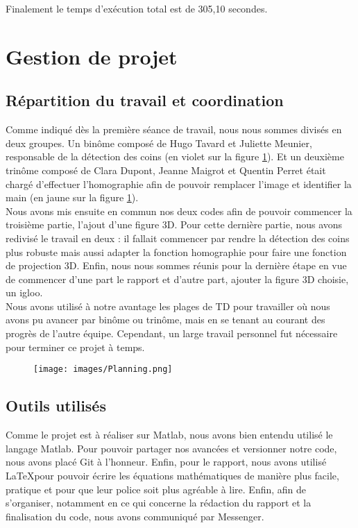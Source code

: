 \documentclass[blue]{ceri/sty/rapport}
\begin{document}
Finalement le temps d'exécution total est de 305,10 secondes. 
\section{Gestion de projet}
\label{sec:Generalites4}


\subsection{Répartition du travail et coordination}
Comme indiqué dès la première séance de travail,  nous nous sommes divisés en deux groupes. Un binôme composé de Hugo Tavard et Juliette Meunier, responsable de la détection des coins (en violet sur la figure 
 \ref{fig:uapv}). Et un deuxième trinôme composé de Clara Dupont, Jeanne Maigrot et Quentin Perret était chargé d'effectuer l'homographie afin de pouvoir remplacer l'image et identifier la main (en jaune sur la figure  \ref{fig:uapv}).
\\

Nous avons mis ensuite en commun nos deux codes afin de pouvoir commencer la troisième partie, l'ajout d'une figure 3D. Pour cette dernière partie, nous avons redivisé le travail en deux : il fallait commencer par rendre la détection des coins plus robuste mais aussi adapter la fonction homographie pour faire une fonction de projection 3D. Enfin, nous nous sommes réunis pour la dernière étape en vue de commencer d'une part le rapport et d'autre part, ajouter la figure 3D choisie, un igloo.
\\

Nous avons utilisé à notre avantage les plages de TD pour travailler où nous avons pu avancer par binôme ou trinôme, mais en se tenant au courant des progrès de l'autre équipe. Cependant, un large travail personnel fut nécessaire pour terminer ce projet à temps.  

\begin{figure}[H]
\centering
\texttt{[image: images/Planning.png]}
\caption[planning]{}
\label{fig:uapv}
\end{figure}

\subsection{Outils utilisés}
Comme le projet est à réaliser sur Matlab, nous avons bien entendu utilisé le langage Matlab. Pour pouvoir partager nos avancées et versionner notre code, nous avons placé Git à l'honneur.
Enfin, pour le rapport, nous avons utilisé \LaTeX  pour pouvoir écrire les équations mathématiques de manière plus facile, pratique et pour que leur police soit plus agréable à lire.
Enfin, afin de s'organiser, notamment en ce qui concerne la rédaction du rapport et la finalisation du code, nous avons communiqué par Messenger.
\end{document}
